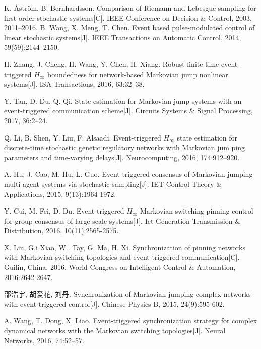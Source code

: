 \begin{thebibliography}{99}
 K. {\AA}ström, B. Bernhardsson. Comparison of Riemann and Lebesgue sampling for first order stochastic systems[C]. IEEE Conference on Decision \& Control, 2003, 2011–2016.
 B. Wang, X. Meng, T. Chen. Event based pulse-modulated control of linear stochastic systems[J]. IEEE Transactions on Automatic Control, 2014, 59(59):2144–2150.

H. Zhang, J. Cheng, H. Wang, Y. Chen, H. Xiang.
Robust finite-time event-triggered {$H_\infty$} boundedness for network-based Markovian jump nonlinear systems[J]. ISA Transactions, 2016, 63:32–38.

Y. Tan, D. Du, Q. Qi.
State estimation for Markovian jump systems with an event-triggered communication scheme[J]. Circuits Systems \& Signal Processing, 2017, 36:2–24.

Q. Li, B. Shen, Y. Liu, F. Alsaadi.
Event-triggered {$H_\infty$} state estimation for discrete-time stochastic genetic regulatory networks with Markovian jum ping parameters and time-varying delays[J]. Neurocomputing, 2016, 174:912–920.

A. Hu, J. Cao, M. Hu, L. Guo.
Event-triggered consensus of Markovian jumping multi-agent systems via stochastic sampling[J]. IET Control Theory $\&$ Applications, 2015, 9(13):1964-1972.

Y. Cui, M. Fei, D. Du. Event-triggered {$H_\infty$} Markovian switching pinning control for group consensus of large-scale systems[J]. Iet Generation Transmission $\&$ Distribution, 2016, 10(11):2565-2575.

X. Liu, G.i Xiao, W.. Tay, G. Ma, H. Xi.
Synchronization of pinning networks with Markovian switching topologies and event-triggered communication[C]. Guilin, China. 2016. World Congress on Intelligent Control \& Automation, 2016:2642-2647.

邵浩宇, 胡爱花, 刘丹.
Synchronization of Markovian jumping complex networks with event-triggered control[J]. Chinese Physics B, 2015, 24(9):595-602.

A. Wang, T. Dong, X. Liao.
Event-triggered synchronization strategy for complex dynamical networks with the Markovian switching topologies[J]. Neural Networks, 2016, 74:52–57.



\end{thebibliography}

